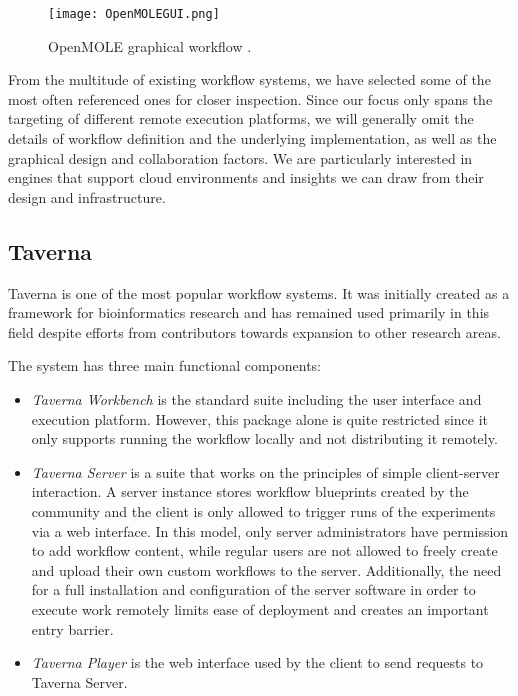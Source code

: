 \begin{figure}[H]
	\centering
		\texttt{[image: OpenMOLEGUI.png]}
	\caption{OpenMOLE graphical workflow \cite{Reuillon2012}.}
	\label{OpenMOLEGUI}
\end{figure}

From the multitude of existing workflow systems, we have selected some of the most often referenced ones for closer inspection. Since our focus only spans the targeting of different remote execution platforms, we will generally omit the details of workflow definition and the underlying implementation, as well as the graphical design and collaboration factors. We are particularly interested in engines that support cloud environments and insights we can draw from their design and infrastructure.

\subsection{Taverna}

Taverna \cite{Wolstencroft2013} is one of the most popular workflow systems. It was initially created as a framework for bioinformatics research and has remained used primarily in this field despite efforts from contributors towards expansion to other research areas.

The system has three main functional components:
\begin{itemize}
	\item \textit{Taverna Workbench} is the standard suite including the user interface and execution platform. However, this package alone is quite restricted since it only supports running the workflow locally and not distributing it remotely.
	\item \textit{Taverna Server} is a suite that works on the principles of simple client-server interaction. A server instance stores workflow blueprints created by the community and the client is only allowed to trigger runs of the experiments via a web interface. In this model, only server administrators have permission to add workflow content, while regular users are not allowed to freely create and upload their own custom workflows to the server. Additionally, the need for a full installation and configuration of the server software in order to execute work remotely limits ease of deployment and creates an important entry barrier.
	\item \textit{Taverna Player} is the web interface used by the client to send requests to Taverna Server.
\end{itemize}

